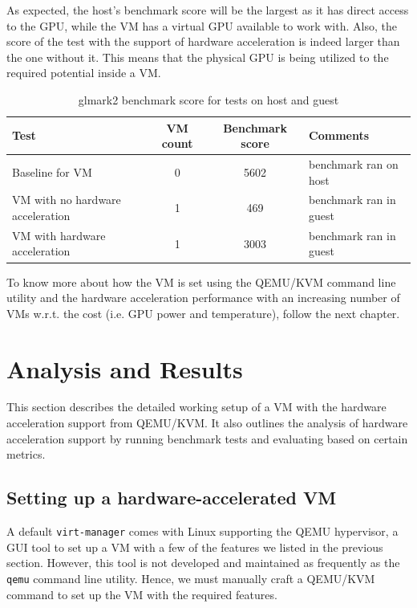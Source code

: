 \documentclass[a4paper,12pt, final]{report}
\begin{document}
\noindent As expected, the host's benchmark score will be the largest as it has direct access to the GPU, while the VM has a virtual GPU available to work with. Also, the score of the test with the support of hardware acceleration is indeed larger than the one without it. This means that the physical GPU is being utilized to the required potential inside a VM.

\begin{table}[H]
\caption{glmark2 benchmark score for tests on host and guest}
    \label{tab:glmark2_tests_host_guest}
    \centering
    \begin{tabular}{|p{5cm}|c|c|p{4.5cm}|}
        \hline
        Test & VM count & Benchmark score & Comments \\ \hline
        Baseline for VM & 0 & 5602 & benchmark ran on host \\ \hline
        VM with no hardware acceleration & 1 & 469 & benchmark ran in guest \\ \hline
        VM with hardware acceleration & 1 & 3003 & benchmark ran in guest \\ \hline
    \end{tabular}
\end{table}

\noindent To know more about how the VM is set using the QEMU/KVM command line utility and the hardware acceleration performance with an increasing number of VMs w.r.t. the cost (i.e. GPU power and temperature), follow the next chapter.

\chapter{Analysis and Results}
This section describes the detailed working setup of a VM with the hardware acceleration support from QEMU/KVM. It also outlines the analysis of hardware acceleration support by running benchmark tests and evaluating based on certain metrics.

\section{Setting up a hardware-accelerated VM}
\noindent A default \verb|virt-manager| comes with Linux supporting the QEMU hypervisor, a GUI tool to set up a VM with a few of the features we listed in the previous section. However, this tool is not developed and maintained as frequently as the \verb|qemu| command line utility. Hence, we must manually craft a QEMU/KVM command to set up the VM with the required features.\\
\end{document}
